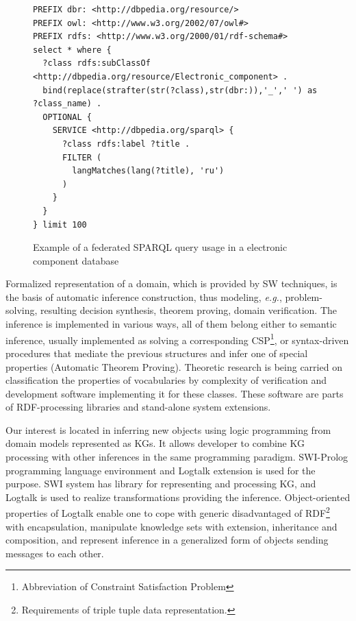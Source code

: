 \documentclass[
]{ceurart}
\begin{document}
\begin{figure}[bth]
  \centering
\begin{verbatim}
PREFIX dbr: <http://dbpedia.org/resource/>
PREFIX owl: <http://www.w3.org/2002/07/owl#>
PREFIX rdfs: <http://www.w3.org/2000/01/rdf-schema#>
select * where {
  ?class rdfs:subClassOf <http://dbpedia.org/resource/Electronic_component> .
  bind(replace(strafter(str(?class),str(dbr:)),'_',' ') as ?class_name) .
  OPTIONAL {
    SERVICE <http://dbpedia.org/sparql> {
      ?class rdfs:label ?title .
      FILTER (
        langMatches(lang(?title), 'ru')
      )
    }
  }
} limit 100
\end{verbatim}
  \caption{Example of a federated SPARQL query usage in a electronic component database}
  \label{fig:sparql-ex1}
\end{figure}

Formalized representation of a domain, which is provided by SW techniques, is the basis of automatic  inference construction, thus modeling, \emph{e.g.}, problem-solving, resulting decision synthesis, theorem proving, domain verification.  The inference is implemented in various ways, all of them belong either to semantic inference, usually implemented as solving a corresponding CSP\footnote{Abbreviation of Constraint Satisfaction Problem}, or syntax-driven procedures that mediate the previous structures and infer one of special properties (Automatic Theorem Proving).  Theoretic research is being carried on classification the properties of vocabularies by complexity of verification and development software implementing it for these classes.  These software are parts of RDF-processing libraries and stand-alone system extensions.

Our interest is located in inferring new objects using logic programming from domain models represented as KGs.  It allows developer to combine KG processing with other inferences in the same programming paradigm.  SWI-Prolog programming language environment and Logtalk extension is used for the purpose.  SWI system has library for representing and processing KG, and Logtalk is used to realize transformations providing the inference.  Object-oriented properties of Logtalk enable one to cope with generic disadvantaged of RDF\footnote{Requirements of triple tuple data representation.} with encapsulation, manipulate knowledge sets with extension, inheritance and composition, and represent inference in a generalized form of objects sending messages to each other.


\end{document}
